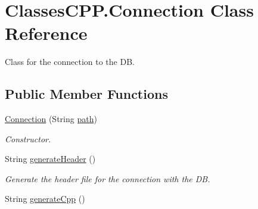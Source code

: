 \hypertarget{class_classes_c_p_p_1_1_connection}{
\section{ClassesCPP.Connection Class Reference}
\label{class_classes_c_p_p_1_1_connection}
}


Class for the connection to the DB.  


\subsection*{Public Member Functions}
\begin{DoxyCompactItemize}
\item 
\hyperlink{class_classes_c_p_p_1_1_connection_ae7d954d3fdd26e2a14265b59d419bfbc}{Connection} (String \hyperlink{class_classes_c_p_p_1_1_connection_a36009c576cf538cfc00828ff5fdb079e}{path})
\begin{DoxyCompactList}\small\item\em Constructor. \end{DoxyCompactList}\item 
\hypertarget{class_classes_c_p_p_1_1_connection_a754da55517dad3b6fffc7f595721778d}{
String \hyperlink{class_classes_c_p_p_1_1_connection_a754da55517dad3b6fffc7f595721778d}{generateHeader} ()}
\label{class_classes_c_p_p_1_1_connection_a754da55517dad3b6fffc7f595721778d}

\begin{DoxyCompactList}\small\item\em Generate the header file for the connection with the DB. \end{DoxyCompactList}\item 
\hypertarget{class_classes_c_p_p_1_1_connection_a704943978dcc979ea5318665fea5a3e1}{
String \hyperlink{class_classes_c_p_p_1_1_connection_a704943978dcc979ea5318665fea5a3e1}{generateCpp} ()}
\label{class_classes_c_p_p_1_1_connection_a704943978dcc979ea5318665fea5a3e1}


\end{DoxyCompactItemize}
